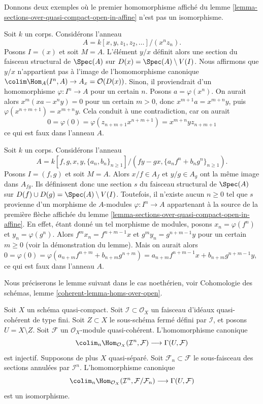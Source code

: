 \begin{example}
\label{example-does-not-work-in-general}
Donnons deux exemples où le premier homomorphisme affiché du
lemme \ref{lemma-sections-over-quasi-compact-open-in-affine}
n'est pas un isomorphisme.

\medskip\noindent
Soit $k$ un corps. Considérons l'anneau
$$
A = k[x, y, z_1, z_2, \ldots]/(x^nz_n).
$$
Posons $I = (x)$ et soit $M = A$. L'élément $y/x$ définit alors une section
du faisceau structural de $\Spec(A)$ sur $D(x) = \Spec(A) \setminus V(I)$.
Nous affirmons que $y/x$ n'appartient pas à l'image de l'homomorphisme canonique
$\colim \Hom_A(I^n, A) \to A_x = \mathcal{O}(D(x))$. Sinon,
il proviendrait d'un homomorphisme $\varphi : I^n \to A$ pour un certain $n$.
Posons $a = \varphi(x^n)$. On aurait alors $x^m(xa - x^ny) = 0$ pour un certain
$m > 0$, donc $x^{m + 1}a = x^{m + n}y$, puis
$\varphi(x^{n + m + 1}) = x^{m + n}y$. Cela conduit à une contradiction,
car on aurait
$$
0 = \varphi(0) = \varphi(z_{n + m + 1} x^{n + m + 1}) =
x^{m + n}y z_{n + m + 1}
$$
ce qui est faux dans l'anneau $A$.

\medskip\noindent
Soit $k$ un corps. Considérons l'anneau
$$
A = k[f, g, x, y, \{a_n, b_n\}_{n \geq 1}]/
(fy - gx, \{a_nf^n + b_ng^n\}_{n \geq 1}).
$$
Posons $I = (f, g)$ et soit $M = A$. Alors $x/f \in A_f$ et $y/g \in A_g$
ont la même image dans $A_{fg}$. Ils définissent donc une section $s$
du faisceau structural de $\Spec(A)$ sur
$D(f) \cup D(g) = \Spec(A) \setminus V(I)$. Toutefois, il n'existe aucun
$n \geq 0$ tel que $s$ provienne d'un morphisme de $A$-modules
$\varphi : I^n \to A$ appartenant à la source de la première flèche affichée
du lemme \ref{lemma-sections-over-quasi-compact-open-in-affine}.
En effet, étant donné un tel morphisme de modules, posons
$x_n = \varphi(f^n)$ et $y_n = \varphi(g^n)$.
Alors $f^mx_n = f^{n + m - 1}x$ et
$g^my_n = g^{n + m - 1}y$ pour un certain $m \geq 0$ (voir la démonstration
du lemme). Mais on aurait alors
$0 = \varphi(0) =
\varphi(a_{n + m}f^{n + m} + b_{n + m}g^{n + m}) =
a_{n + m}f^{n + m - 1}x + b_{n + m}g^{n + m - 1}y$, ce qui est faux
dans l'anneau $A$.
\end{example}

\noindent
Nous préciserons le lemme suivant dans le cas noethérien, voir
Cohomologie des schémas, lemme \ref{coherent-lemma-homs-over-open}.

\begin{lemma}
\label{lemma-sections-over-quasi-compact-open}
Soit $X$ un schéma quasi-compact.
Soit $\mathcal{I} \subset \mathcal{O}_X$ un
faisceau d'idéaux quasi-cohérent de type fini.
Soit $Z \subset X$ le sous-schéma fermé
défini par $\mathcal{I}$, et posons $U = X \setminus Z$.
Soit $\mathcal{F}$ un $\mathcal{O}_X$-module quasi-cohérent.
L'homomorphisme canonique
$$
\colim_n \Hom_{\mathcal{O}_X}(\mathcal{I}^n,
\mathcal{F})
\longrightarrow
\Gamma(U, \mathcal{F})
$$
est injectif. Supposons de plus $X$ quasi-séparé.
Soit $\mathcal{F}_n \subset \mathcal{F}$
le sous-faisceau des sections annulées par $\mathcal{I}^n$.
L'homomorphisme canonique
$$
\colim_n \Hom_{\mathcal{O}_X}(\mathcal{I}^n,
\mathcal{F}/\mathcal{F}_n)
\longrightarrow
\Gamma(U, \mathcal{F})
$$
est un isomorphisme.
\end{lemma}

